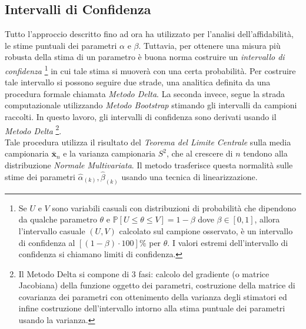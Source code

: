 \documentclass[10pt]{article} %
\begin{document}
\subsection{Intervalli di Confidenza}
Tutto l'approccio descritto fino ad ora ha utilizzato per l'analisi dell'affidabilità, le stime puntuali dei parametri $\alpha$ e $\beta$. Tuttavia, per ottenere una misura più robusta della stima di un parametro è buona norma costruire un \textit{intervallo di confidenza} \footnote{Se $U$ e $V$ sono variabili casuali con distribuzioni di probabilità che dipendono da qualche parametro $\theta$ e $\mathbb{P}[U\le \theta \le V] = 1-\beta$ dove $\beta \in [0, 1]$, allora l'intervallo casuale $(U, V)$ calcolato sul campione osservato, è un intervallo di confidenza al $[(1-\beta)\cdot100]\%$ per $\theta$. I valori estremi dell'intervallo di confidenza si chiamano limiti di confidenza.} in cui tale stima si muoverà con una certa probabilità. Per costruire tale intervallo si possono seguire due strade, una analitica definita da una procedura formale chiamata \textit{Metodo Delta}. La seconda invece, segue la strada computazionale utilizzando \textit{Metodo Bootstrap} stimando gli intervalli da campioni raccolti. In questo lavoro, gli intervalli di confidenza sono derivati usando il \textit{Metodo Delta} \footnote{Il Metodo Delta si compone di 3 fasi: calcolo del gradiente (o matrice Jacobiana) della funzione oggetto dei parametri, costruzione della matrice di covarianza dei parametri con ottenimento della varianza degli stimatori ed infine costruzione dell'intervallo intorno alla stima puntuale dei parametri usando la varianza.}.\\
Tale procedura utilizza il risultato del \textit{Teorema del Limite Centrale} sulla media campionaria $\bar{\mathbf{x}}_{n}$ e la varianza campionaria $S^{2}$, che al crescere di $n$ tendono alla distribuzione \textit{Normale Multivariata}. Il metodo trasferisce questa normalità sulle stime dei parametri $\hat{\alpha}_{(k)},\hat{\beta}_{(k)}$ usando una tecnica di linearizzazione.
\end{document}
